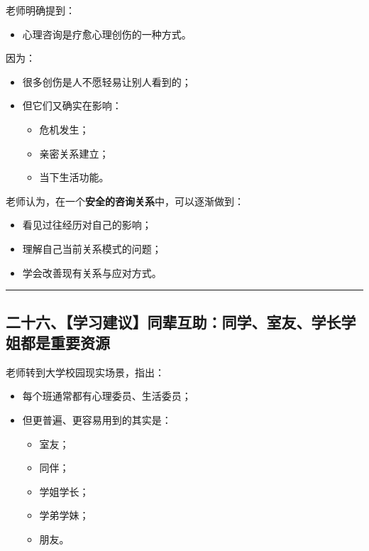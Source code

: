 \documentclass[
  chinese,
  9pt,
  a4paper,
]{ctexart}
\providecommand{\tightlist}{%
  \setlength{\itemsep}{0pt}\setlength{\parskip}{0pt}}
\begin{document}
老师明确提到：

\begin{itemize}
\tightlist
\item
  心理咨询是疗愈心理创伤的一种方式。
\end{itemize}

因为：

\begin{itemize}
\item
  很多创伤是人不愿轻易让别人看到的；
\item
  但它们又确实在影响：

  \begin{itemize}
  \tightlist
  \item
    危机发生；
  \item
    亲密关系建立；
  \item
    当下生活功能。
  \end{itemize}
\end{itemize}

老师认为，在一个\textbf{安全的咨询关系}中，可以逐渐做到：

\begin{itemize}
\tightlist
\item
  看见过往经历对自己的影响；
\item
  理解自己当前关系模式的问题；
\item
  学会改善现有关系与应对方式。
\end{itemize}

\begin{center}\rule{0.5\linewidth}{0.5pt}\end{center}

\subsection{二十六、【学习建议】同辈互助：同学、室友、学长学姐都是重要资源}\label{ux4e8cux5341ux516dux5b66ux4e60ux5efaux8baeux540cux8f88ux4e92ux52a9ux540cux5b66ux5ba4ux53cbux5b66ux957fux5b66ux59d0ux90fdux662fux91cdux8981ux8d44ux6e90}

老师转到大学校园现实场景，指出：

\begin{itemize}
\item
  每个班通常都有心理委员、生活委员；
\item
  但更普遍、更容易用到的其实是：

  \begin{itemize}
  \tightlist
  \item
    室友；
  \item
    同伴；
  \item
    学姐学长；
  \item
    学弟学妹；
  \item
    朋友。
  \end{itemize}
\end{itemize}
\end{document}
